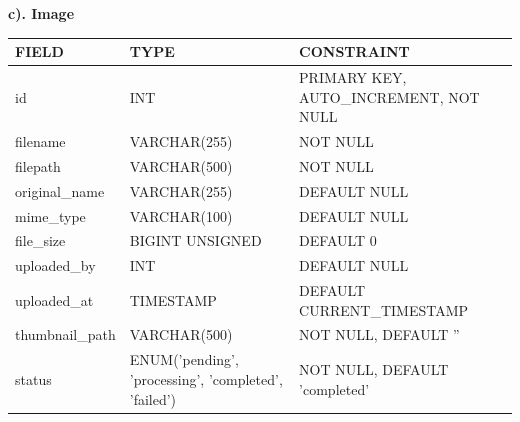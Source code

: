 \clearpage
\noindent\textbf{c). Image}
\vspace{0.2cm}
\begin{center}
    \renewcommand{\arraystretch}{1.3}
    \begin{tabular}{|>{\raggedright\arraybackslash}p{3.0cm}|>{\raggedright\arraybackslash}p{4.5cm}|>{\raggedright\arraybackslash}p{8.5cm}|}
        \hline
        \rowcolor{lightgray!50}
        \textbf{FIELD}  & \textbf{TYPE}                                        & \textbf{CONSTRAINT}                    \\ \hline
        id              & INT                                                  & PRIMARY KEY, AUTO\_INCREMENT, NOT NULL \\ \hline
        filename        & VARCHAR(255)                                         & NOT NULL                               \\ \hline
        filepath        & VARCHAR(500)                                         & NOT NULL                               \\ \hline
        original\_name  & VARCHAR(255)                                         & DEFAULT NULL                           \\ \hline
        mime\_type      & VARCHAR(100)                                         & DEFAULT NULL                           \\ \hline
        file\_size      & BIGINT UNSIGNED                                      & DEFAULT 0                              \\ \hline
        uploaded\_by    & INT                                                  & DEFAULT NULL                           \\ \hline
        uploaded\_at    & TIMESTAMP                                            & DEFAULT CURRENT\_TIMESTAMP             \\ \hline
        thumbnail\_path & VARCHAR(500)                                         & NOT NULL, DEFAULT ''                   \\ \hline
        status          & ENUM('pending', 'processing', 'completed', 'failed') & NOT NULL, DEFAULT 'completed'          \\ \hline
    \end{tabular}
\end{center}

